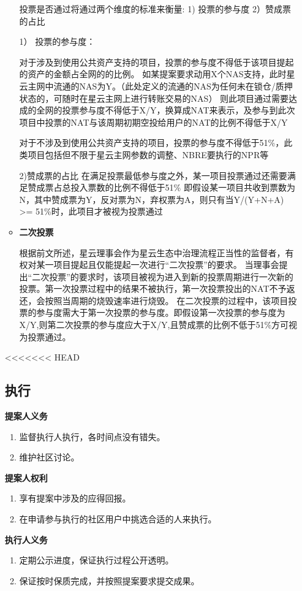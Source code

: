 \begin{enumerate}
\begin{itemize}
	投票是否通过将通过两个维度的标准来衡量: 1) 投票的参与度 2）赞成票的占比

	1） 投票的参与度：

	对于涉及到使用公共资产支持的项目，投票的参与度不得低于该项目提起的资产的金额占全网的的比例。
	如某提案要求动用X个NAS支持，此时星云主网中流通的NAS为Y。（此处定义的流通的NAS为任何未在锁仓/质押状态的，可随时在星云主网上进行转账交易的NAS）
	则此项目通过需要达成的全网的投票参与度不得低于X/Y，换算成NAT来表示，及参与到此次项目中投票的NAT与该周期初期空投给用户的NAT的比例不得低于X/Y

	对于不涉及到使用公共资产支持的项目，投票的参与度不得低于51\%，此类项目包括但不限于星云主网参数的调整、NBRE要执行的NPR等

	2)赞成票的占比
	在满足投票最低参与度之外，某一项目投票通过还需要满足赞成票占总投入票数的比例不得低于51\%
	即假设某一项目共收到票数为N，其中赞成票为Y，反对票为N，弃权票为A，则只有当Y/(Y+N+A) >= 51\%时，此项目才被视为投票通过

	\item \textbf{二次投票}
	
	根据前文所述，星云理事会作为星云生态中治理流程正当性的监督者，有权对某一项目提起且仅能提起一次进行“二次投票”的要求。
	当理事会提出“二次投票”的要求时，该项目被视为进入到新的投票周期进行一次新的投票。第一次投票过程中的结果不被执行，第一次投票投出的NAT不予返还，会按照当周期的烧毁速率进行烧毁。
	在二次投票的过程中，该项目投票的参与度需大于第一次投票的参与度。即假设第一次投票的参与度为X/Y,则第二次投票的参与度应大于X/Y,且赞成票的比例不低于51\%方可视为投票通过。
	
\end{itemize}

<<<<<<< HEAD
\subsection{执行}
\textbf{提案人义务}
\begin{enumerate}
\item 监督执行人执行，各时间点没有错失。
\item 维护社区讨论。
\end{enumerate}

\textbf{提案人权利}
\begin{enumerate}
\item 享有提案中涉及的应得回报。
\item 在申请参与执行的社区用户中挑选合适的人来执行。
\end{enumerate}

\textbf{执行人义务}
\begin{enumerate}
\item 定期公示进度，保证执行过程公开透明。
\item 保证按时保质完成，并按照提案要求提交成果。
\end{enumerate}


\end{enumerate}
